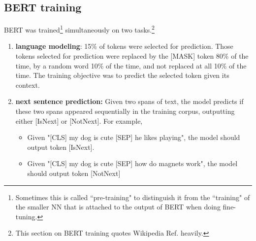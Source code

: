 \subsection{BERT training}
BERT was trained\footnote{Sometimes
this is called ``pre-training"
to distinguish it from
the ``training" of the  smaller NN that is attached to the output of BERT when doing
fine-tuning.} simultaneously on two tasks.\footnote{This section on BERT training quotes Wikipedia Ref.\cite{wiki-BERT}
heavily.}


\begin{enumerate}
\item {\bf language modeling}: 15\% of tokens were selected for prediction. Those tokens
selected for
prediction
were replaced by the [MASK] token 80\% of the time,
by a random word 10\% of the time,
and not replaced at all 10\% of the time. The training objective was to predict the selected token given its context. 

\item{\bf next sentence prediction: }
Given two spans of text, the model predicts if these two spans appeared sequentially in the training corpus, outputting either [IsNext] or [NotNext].
For example,

\begin{itemize}
\item Given "[CLS] my dog is cute [SEP] he likes playing", the model should output token [IsNext].
\item Given "[CLS] my dog is cute [SEP] how do magnets work", the model should output token [NotNext]
\end{itemize}

\end{enumerate}

